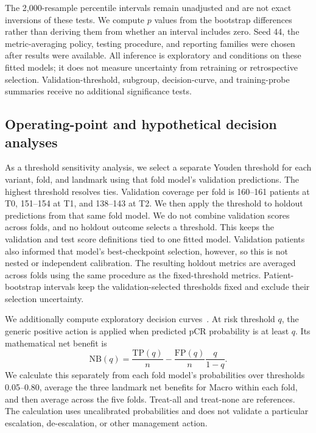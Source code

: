 The 2,000-resample percentile intervals remain unadjusted and are not exact inversions of these tests. We compute $p$ values from the bootstrap differences rather than deriving them from whether an interval includes zero. Seed 44, the metric-averaging policy, testing procedure, and reporting families were chosen after results were available. All inference is exploratory and conditions on these fitted models; it does not measure uncertainty from retraining or retrospective selection. Validation-threshold, subgroup, decision-curve, and training-probe summaries receive no additional significance tests.

\subsection{Operating-point and hypothetical decision analyses}
As a threshold sensitivity analysis, we select a separate Youden threshold for each variant, fold, and landmark using that fold model's validation predictions. The highest threshold resolves ties. Validation coverage per fold is 160--161 patients at T0, 151--154 at T1, and 138--143 at T2. We then apply the threshold to holdout predictions from that same fold model. We do not combine validation scores across folds, and no holdout outcome selects a threshold. This keeps the validation and test score definitions tied to one fitted model. Validation patients also informed that model's best-checkpoint selection, however, so this is not nested or independent calibration. The resulting holdout metrics are averaged across folds using the same procedure as the fixed-threshold metrics. Patient-bootstrap intervals keep the validation-selected thresholds fixed and exclude their selection uncertainty.

We additionally compute exploratory decision curves~\citep{vickers2006dca}. At risk threshold $q$, the generic positive action is applied when predicted pCR probability is at least $q$. Its mathematical net benefit is
\begin{equation}
 \mathrm{NB}(q)=\frac{\mathrm{TP}(q)}{n}
 -\frac{\mathrm{FP}(q)}{n}\frac{q}{1-q}.
\end{equation}
We calculate this separately from each fold model's probabilities over thresholds 0.05--0.80, average the three landmark net benefits for Macro within each fold, and then average across the five folds. Treat-all and treat-none are references. The calculation uses uncalibrated probabilities and does not validate a particular escalation, de-escalation, or other management action.

